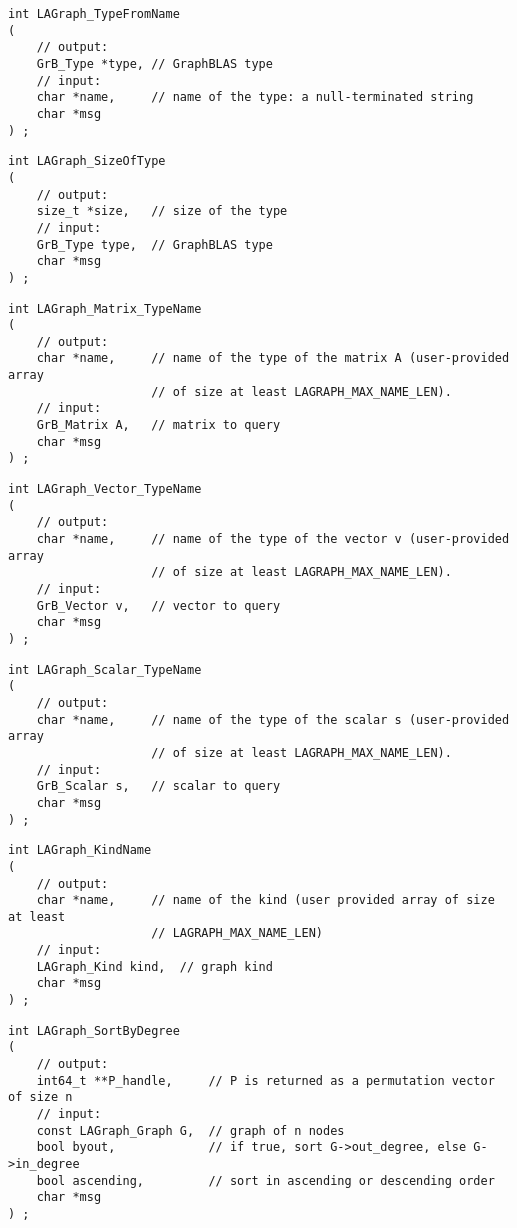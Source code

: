 \begin{verbatim}
int LAGraph_TypeFromName
(
    // output:
    GrB_Type *type, // GraphBLAS type
    // input:
    char *name,     // name of the type: a null-terminated string
    char *msg
) ;
\end{verbatim}




\begin{verbatim}
int LAGraph_SizeOfType
(
    // output:
    size_t *size,   // size of the type
    // input:
    GrB_Type type,  // GraphBLAS type
    char *msg
) ;
\end{verbatim}




\begin{verbatim}
int LAGraph_Matrix_TypeName
(
    // output:
    char *name,     // name of the type of the matrix A (user-provided array
                    // of size at least LAGRAPH_MAX_NAME_LEN).
    // input:
    GrB_Matrix A,   // matrix to query
    char *msg
) ;
\end{verbatim}




\begin{verbatim}
int LAGraph_Vector_TypeName
(
    // output:
    char *name,     // name of the type of the vector v (user-provided array
                    // of size at least LAGRAPH_MAX_NAME_LEN).
    // input:
    GrB_Vector v,   // vector to query
    char *msg
) ;
\end{verbatim}




\begin{verbatim}
int LAGraph_Scalar_TypeName
(
    // output:
    char *name,     // name of the type of the scalar s (user-provided array
                    // of size at least LAGRAPH_MAX_NAME_LEN).
    // input:
    GrB_Scalar s,   // scalar to query
    char *msg
) ;
\end{verbatim}




\begin{verbatim}
int LAGraph_KindName
(
    // output:
    char *name,     // name of the kind (user provided array of size at least
                    // LAGRAPH_MAX_NAME_LEN)
    // input:
    LAGraph_Kind kind,  // graph kind
    char *msg
) ;
\end{verbatim}




\begin{verbatim}
int LAGraph_SortByDegree
(
    // output:
    int64_t **P_handle,     // P is returned as a permutation vector of size n
    // input:
    const LAGraph_Graph G,  // graph of n nodes
    bool byout,             // if true, sort G->out_degree, else G->in_degree
    bool ascending,         // sort in ascending or descending order
    char *msg
) ;
\end{verbatim}




